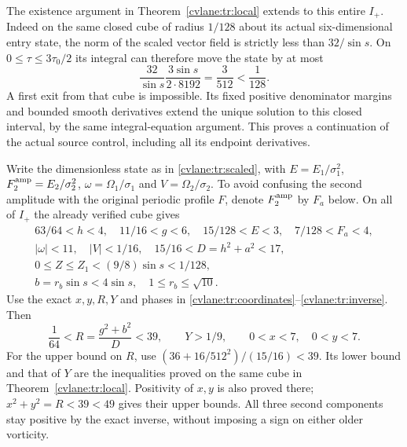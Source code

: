 The existence argument in Theorem~\ref{cvlane:tr:local} extends to
this entire $I_+$. Indeed on the same closed cube of radius
$1/128$ about its actual six-dimensional entry state, the norm of
the scaled vector field is strictly less than $32/\sin s$.
On $0\leq\tau\leq3\tau_0/2$ its integral can therefore
move the state by at most
\[
 \frac{32}{\sin s}\frac{3\sin s}{2\cdot8192}
     =\frac3{512}<\frac1{128}.
\]
A first exit from that cube is impossible. Its fixed positive
denominator margins and bounded smooth derivatives extend the
unique solution to this closed interval, by the same integral-equation
argument. This proves a continuation of the actual source control,
including all its endpoint derivatives.

Write the dimensionless state as in \eqref{cvlane:tr:scaled}, with
$E=E_1/\sigma_1^2$, $F_2^{\rm amp}=E_2/\sigma_2^2$,
$\omega=\Omega_1/\sigma_1$ and $V=\Omega_2/\sigma_2$.
To avoid confusing the second amplitude with the original periodic
profile $F$, denote $F_2^{\rm amp}$ by $F_a$ below. On all of
$I_+$ the already verified cube gives
\begin{equation}\label{cvlane:trls:cube}
 \begin{gathered}
 63/64<h<4,\quad 11/16<g<6,\quad
 15/128<E<3,\quad 7/128<F_a<4,\\
 |\omega|<11,\quad |V|<1/16,\quad
 15/16<D=h^2+a^2<17,\\
 0\leq Z\leq Z_1<(9/8)\sin s<1/128,\\
 b=r_b\sin s<4\sin s,\quad 1\leq r_b\leq\sqrt{10}.
 \end{gathered}
\end{equation}
Use the exact $x,y,R,Y$ and phases in
\eqref{cvlane:tr:coordinates}--\eqref{cvlane:tr:inverse}. Then
\begin{equation}\label{cvlane:trls:phasebounds}
 \frac1{64}<R=\frac{g^2+b^2}{D}<39,
 \qquad Y>1/9,\qquad 0<x<7,\quad 0<y<7.
\end{equation}
For the upper bound on $R$, use
$(36+16/512^2)/(15/16)<39$. Its lower bound and that of
$Y$ are the inequalities proved on the same cube in
Theorem~\ref{cvlane:tr:local}. Positivity of $x,y$ is also proved
there; $x^2+y^2=R<39<49$ gives their upper bounds.
All three second components stay positive by the exact inverse,
without imposing a sign on either older vorticity.

